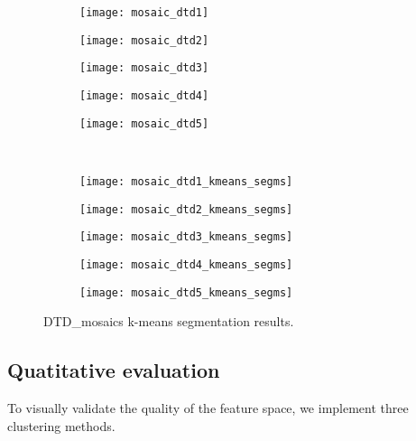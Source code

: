 \begin{figure}[!ht]
    \centering
    \begin{subfigure}[b]{0.19\textwidth}
        \texttt{[image: mosaic\_dtd1]}
    \end{subfigure} 
    \begin{subfigure}[b]{0.19\textwidth}
    	\texttt{[image: mosaic\_dtd2]}
    \end{subfigure}     
    \begin{subfigure}[b]{0.19\textwidth}
        \texttt{[image: mosaic\_dtd3]}
    \end{subfigure}
    \begin{subfigure}[b]{0.19\textwidth}
    	\texttt{[image: mosaic\_dtd4]}
    \end{subfigure}    
    \begin{subfigure}[b]{0.19\textwidth}
        \texttt{[image: mosaic\_dtd5]}
    \end{subfigure} \\ [2ex]
    
    \begin{subfigure}[b]{0.19\textwidth}
    	\texttt{[image: mosaic\_dtd1\_kmeans\_segms]}
        \caption{}
    \end{subfigure}     
    \begin{subfigure}[b]{0.19\textwidth}
        \texttt{[image: mosaic\_dtd2\_kmeans\_segms]}
        \caption{}
    \end{subfigure} 
    \begin{subfigure}[b]{0.19\textwidth}
    	\texttt{[image: mosaic\_dtd3\_kmeans\_segms]}
        \caption{}
    \end{subfigure}     
    \begin{subfigure}[b]{0.19\textwidth}
        \texttt{[image: mosaic\_dtd4\_kmeans\_segms]}
        \caption{}
    \end{subfigure}
    \begin{subfigure}[b]{0.19\textwidth}
    	\texttt{[image: mosaic\_dtd5\_kmeans\_segms]}
        \caption{}
    \end{subfigure} 
        	    
    \caption{DTD_mosaics k-means segmentation results.}\label{fig:kmeans_segms_dtd_mosaics}    
\end{figure}


\subsection{Quatitative evaluation}
To visually validate the quality of the feature space, we implement three clustering methods. 


